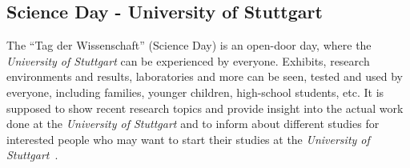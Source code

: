 \subsection{Science Day - University of Stuttgart}\label{subsec:science-day---university-of-stuttgart}
The ``Tag der Wissenschaft'' (Science Day) is an open-door day, where the \textit{University of Stuttgart} can be experienced by everyone.
Exhibits, research environments and results, laboratories and more can be seen, tested and used by everyone, including families, younger children,
high-school students, etc.
It is supposed to show recent research topics and provide insight into the actual work done at the \textit{University of Stuttgart} and to
inform about different studies for interested people who may want to start their studies at the \textit{University of Stuttgart}~\cite{tag-der-wissenschaft}.